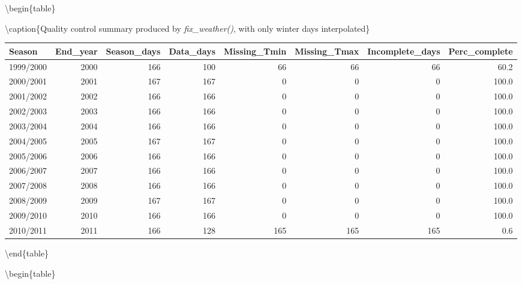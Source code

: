 \documentclass[
]{book}
\newenvironment{Shaded}{\begin{snugshade}}{\end{snugshade}}
\newcommand{\DataTypeTok}[1]{\textcolor[rgb]{0.13,0.29,0.53}{#1}}
\newcommand{\DecValTok}[1]{\textcolor[rgb]{0.00,0.00,0.81}{#1}}
\newcommand{\KeywordTok}[1]{\textcolor[rgb]{0.13,0.29,0.53}{\textbf{#1}}}
\newcommand{\NormalTok}[1]{#1}
\newcommand{\OperatorTok}[1]{\textcolor[rgb]{0.81,0.36,0.00}{\textbf{#1}}}
\newcommand{\StringTok}[1]{\textcolor[rgb]{0.31,0.60,0.02}{#1}}
\begin{document}
\textbackslash begin\{table\}

\textbackslash caption\{\label{tab:unnamed-chunk-7}Quality control summary produced by \emph{fix\_weather()}, with only winter days interpolated\}
\fontsize{10}{12}\selectfont

\begin{tabular}[t]{l|r|r|r|r|r|r|r}
\hline
Season & End\_year & Season\_days & Data\_days & Missing\_Tmin & Missing\_Tmax & Incomplete\_days & Perc\_complete\\
\hline
1999/2000 & 2000 & 166 & 100 & 66 & 66 & 66 & 60.2\\
\hline
2000/2001 & 2001 & 167 & 167 & 0 & 0 & 0 & 100.0\\
\hline
2001/2002 & 2002 & 166 & 166 & 0 & 0 & 0 & 100.0\\
\hline
2002/2003 & 2003 & 166 & 166 & 0 & 0 & 0 & 100.0\\
\hline
2003/2004 & 2004 & 166 & 166 & 0 & 0 & 0 & 100.0\\
\hline
2004/2005 & 2005 & 167 & 167 & 0 & 0 & 0 & 100.0\\
\hline
2005/2006 & 2006 & 166 & 166 & 0 & 0 & 0 & 100.0\\
\hline
2006/2007 & 2007 & 166 & 166 & 0 & 0 & 0 & 100.0\\
\hline
2007/2008 & 2008 & 166 & 166 & 0 & 0 & 0 & 100.0\\
\hline
2008/2009 & 2009 & 167 & 167 & 0 & 0 & 0 & 100.0\\
\hline
2009/2010 & 2010 & 166 & 166 & 0 & 0 & 0 & 100.0\\
\hline
2010/2011 & 2011 & 166 & 128 & 165 & 165 & 165 & 0.6\\
\hline
\end{tabular}

\textbackslash end\{table\}

\begin{Shaded}
\end{Shaded}

\textbackslash begin\{table\}
\end{document}
